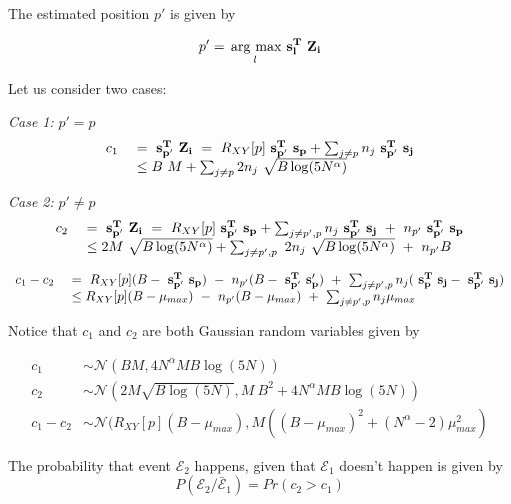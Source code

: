 The estimated position $p'$ is given by

\[ p' = \underset{l}{\operatorname*{\,arg\ max}}\ \bf s^T_l ~ Z_i\]

Let us consider two cases:

{\textit{Case 1:} $p' = p$}
 \[
 \begin{array}{ll}
 c_1 \ &= \ \mathbf{s^T_{p'}} ~\mathbf{Z_i} \ = \ R_{XY}[p] {\bf ~s^T_{p'}~ s_p}+ \sum_{j \neq p}n_j {\bf ~s^T_{p'}~ s_j}\\
       &\leq B ~ M +  \sum_{j \neq p} 2 n_j ~ \sqrt{B\log(5N^{\alpha})}  
 \end{array} 
  \]
  
{\textit{Case 2:} $p' \neq p$}
\[
\begin{array}{ll}
c_2 \ &= \ \mathbf{s^T_{p'}} ~\mathbf{Z_i}\ = \ R_{XY}[p]  {\bf ~s^T_{p'}~ s_p}+ \sum_{j \neq p',p}n_j{\bf ~s^T_{p'}~ s_j} \ + \ n_{p'} {\bf ~s^T_{p'}~ s_p} \\
&\leq 2M ~ \sqrt{B\log(5N^{\alpha})} + \sum_{j \neq p',p} \ 2n_j ~ \sqrt{B\log(5N^{\alpha})} \ + \ n_{p'} B
\end{array} 
\]

\[
\begin{array}{ll}
c_1 - c_2 \ &=  \ R_{XY}[p](B - {\bf ~s^T_{p'}~ s_p}) \ - \ n_{p'}(B - {\bf ~s^T_{p'}~ s_p'}) ~ + ~ \sum_{j \neq p',p}n_j ({\bf ~s^T_{p}~ s_j} - {\bf ~s^T_{p'}~ s_j})   \\
&\leq R_{XY}[p] (B-\mu_{max})  \ - \ n_{p'}(B - \mu_{max}) ~ + ~ \sum_{j \neq p',p}n_j \mu_{max} \\
\end{array} 
\]


Notice that $c_1$ and $c_2$ are both Gaussian random variables given by

\[ \begin{array}{ll}
c_1 &\sim  \mathcal{N}(BM,4N^\alpha M B \log(5N)) \\
c_2 &\sim  \mathcal{N}(2M \sqrt{B\log(5N)}, M~B^2 + 4N^\alpha M B \log(5N))\\
c_1 - c_2 &\sim  \mathcal{N}(R_{XY}[p](B-\mu_{max}),M((B-\mu_{max})^2 + (N^{\alpha}-2)\mu_{max}^2)
\end{array}\]

The probability that event $\mathcal{E}_2$ happens, given that $\mathcal{E}_1$ doesn't happen is given by
\[ P(\mathcal{E}_2 / \bar{\mathcal{E}}_1 ) = Pr(c_2 > c_1) \]



